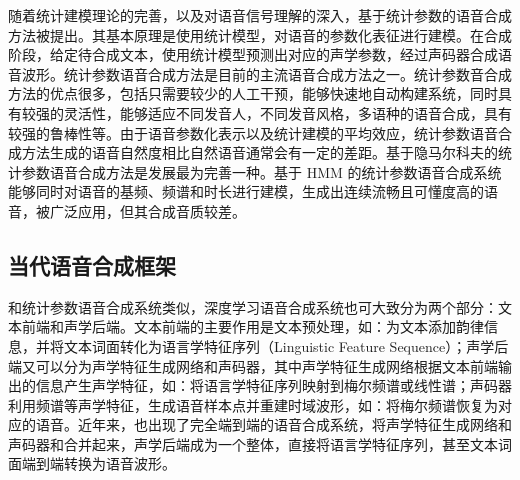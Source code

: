 \documentclass[cn,10pt,math=newtx,citestyle=gb7714-2015,bibstyle=gb7714-2015]{elegantbook}
\begin{document}
  随着统计建模理论的完善，以及对语音信号理解的深入，基于统计参数的语音合成方法被提出。其基本原理是使用统计模型，对语音的参数化表征进行建模。在合成阶段，给定待合成文本，使用统计模型预测出对应的声学参数，经过声码器合成语音波形。统计参数语音合成方法是目前的主流语音合成方法之一。统计参数音合成方法的优点很多，包括只需要较少的人工干预，能够快速地自动构建系统，同时具有较强的灵活性，能够适应不同发音人，不同发音风格，多语种的语音合成，具有较强的鲁棒性等。由于语音参数化表示以及统计建模的平均效应，统计参数语音合成方法生成的语音自然度相比自然语音通常会有一定的差距。基于隐马尔科夫的统计参数语音合成方法是发展最为完善一种。基于 HMM 的统计参数语音合成系统能够同时对语音的基频、频谱和时长进行建模，生成出连续流畅且可懂度高的语音，被广泛应用，但其合成音质较差。

\subsection{当代语音合成框架}

和统计参数语音合成系统类似，深度学习语音合成系统也可大致分为两个部分：文本前端和声学后端。文本前端的主要作用是文本预处理，如：为文本添加韵律信息，并将文本词面转化为语言学特征序列（Linguistic Feature Sequence）；声学后端又可以分为声学特征生成网络和声码器，其中声学特征生成网络根据文本前端输出的信息产生声学特征，如：将语言学特征序列映射到梅尔频谱或线性谱；声码器利用频谱等声学特征，生成语音样本点并重建时域波形，如：将梅尔频谱恢复为对应的语音。近年来，也出现了完全端到端的语音合成系统，将声学特征生成网络和声码器和合并起来，声学后端成为一个整体，直接将语言学特征序列，甚至文本词面端到端转换为语音波形。
\end{document}
